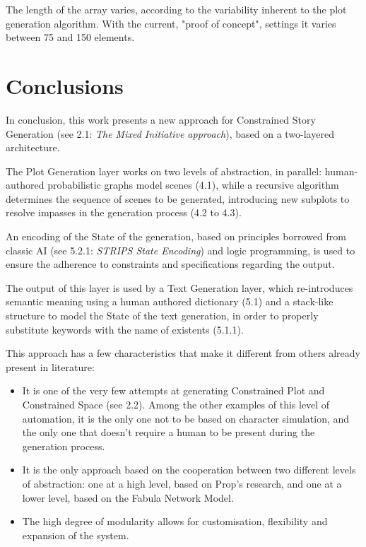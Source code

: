 \documentclass[12pt,a4paper,oneside]{report}
\begin{document}
The length of the array varies, according to the variability inherent to the plot generation algorithm. With the current, "proof of concept", settings it varies between 75 and 150 elements.

\pagebreak

\chapter{Conclusions}
In conclusion, this work presents a new approach for Constrained Story Generation (see 2.1: \textit{The Mixed Initiative approach}), based on a two-layered architecture.

The Plot Generation layer works on two levels of abstraction, in parallel: human-authored probabilistic graphs model scenes (4.1), while a recursive algorithm determines the sequence of scenes to be generated, introducing new subplots to resolve impasses in the generation process (4.2 to 4.3).

An encoding of the State of the generation, based on principles borrowed from classic AI (see 5.2.1: \textit{STRIPS State Encoding}) and logic programming, is used to ensure the adherence to constraints and specifications regarding the output.

\bigskip

The output of this layer is used by a Text Generation layer, which re-introduces semantic meaning using a human authored dictionary (5.1) and a stack-like structure to model the State of the text generation, in order to properly substitute keywords with the name of existents (5.1.1).

\bigskip

This approach has a few characteristics that make it different from others already present in literature:

\begin{itemize}\setlength{\itemsep}{0pt}
\item It is one of the very few attempts at generating Constrained Plot and Constrained Space (see 2.2). Among the other examples of this level of automation, it is the only one not to be based on character simulation, and the only one that doesn't require a human to be present during the generation process.
\item It is the only approach based on the cooperation between two different levels of abstraction: one at a high level, based on Prop's research, and one at a lower level, based on the Fabula Network Model.
\item The high degree of modularity allows for customisation, flexibility and expansion of the system.
\end{itemize}
\end{document}
